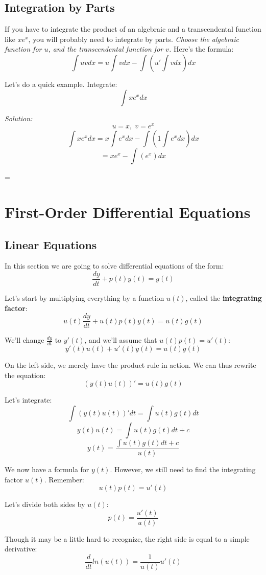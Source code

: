 	\subsection{Integration by Parts}
	If you have to integrate the product of an algebraic and a transcendental function like $xe^{x}$, you will probably need to integrate by parts. \textit{Choose the algebraic function for $u$, and the transcendental function for $v$.} Here's the formula:
	$$\int uvdx = u\int vdx - \int \left(u'\int vdx\right)dx$$
	
	Let's do a quick example. Integrate:
	$$\int xe^{x}dx$$
	
	\textit{Solution:}
	$$u = x,\;v = e^{x}$$
	$$\int xe^{x}dx = x\int e^{x}dx - \int \left(1\int e^{x}dx\right)dx$$
	$$= xe^{x} - \int (e^{x})dx$$
	\begin{center}
		= 
	\end{center}
	
	\section{First-Order Differential Equations}
	\subsection{Linear Equations}
	In this section we are going to solve differential equations of the form: $$\frac{dy}{dt} + p(t)y(t) = g(t)$$
	
	Let's start by multiplying everything by a function $u(t)$, called the \textbf{integrating factor}: $$u(t)\frac{dy}{dt} + u(t)p(t)y(t) = u(t)g(t)$$
	
	We'll change $\frac{dy}{dt}$ to $y'(t)$, and we'll assume that $u(t)p(t)=u'(t)$: $$y'(t)u(t) + u'(t)y(t) = u(t)g(t)$$
	
	On the left side, we merely have the product rule in action. We can thus rewrite the equation: $$(y(t)u(t))' = u(t)g(t)$$
	
	Let's integrate:
	$$\int (y(t)u(t))'dt = \int u(t)g(t)dt$$
	$$y(t)u(t) = \int u(t)g(t)dt + c$$
	$$y(t) = \frac{\int u(t)g(t)dt + c}{u(t)}$$
	
	We now have a formula for $y(t)$. However, we still need to find the integrating factor $u(t)$. Remember: $$u(t)p(t)=u'(t)$$
	
	Let's divide both sides by $u(t)$: $$p(t) = \frac{u'(t)}{u(t)}$$
	
	Though it may be a little hard to recognize, the right side is equal to a simple derivative:
	$$\frac{d}{dt}ln(u(t)) = \frac{1}{u(t)}u'(t)$$
	
